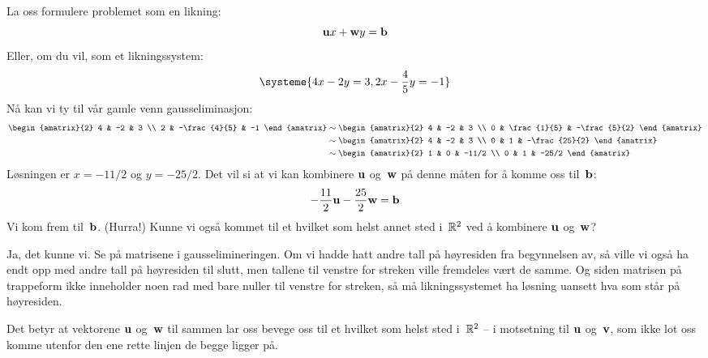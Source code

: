La oss formulere problemet som en likning:
\[
\mathbf{u} x + \mathbf{w} y = \mathbf{b}
\]
Eller, om du vil, som et likningssystem:
\[
\systeme{
  4x - 2y = 3,
  2x - \frac{4}{5}y = -1
  }
\]
Nå kan vi ty til vår gamle venn gausseliminasjon:
\begin{align*}
\begin{amatrix}{2}
4 & -2 & 3 \\
2 & -\frac{4}{5} & -1
\end{amatrix}
&\roweq
\begin{amatrix}{2}
4 & -2 & 3 \\
0 & \frac{1}{5} & -\frac{5}{2}
\end{amatrix}
\\
&\roweq
\begin{amatrix}{2}
4 & -2 & 3 \\
0 & 1 & -\frac{25}{2}
\end{amatrix}
\\
&
\roweq
\begin{amatrix}{2}
1 & 0 & -11/2 \\
0 & 1 & -25/2
\end{amatrix}
\end{align*}
Løsningen er $x = -11/2$ og $y = -25/2$.  Det vil si at vi kan
kombinere $\mathbf{u}$ og~$\mathbf{w}$ på denne måten for å komme oss til~$\mathbf{b}$:
\[
-\frac{11}{2} \mathbf{u} - \frac{25}{2} \mathbf{w} = \mathbf{b}
\]
Vi kom frem til~$\mathbf{b}$.  (Hurra!)  Kunne vi også kommet til et hvilket
som helst annet sted i~$\mathbb{R}^2$ ved å kombinere $\mathbf{u}$ og~$\mathbf{w}$?

Ja, det kunne vi.  Se på matrisene i gausselimineringen.  Om vi hadde
hatt andre tall på høyresiden fra begynnelsen av, så ville vi også ha
endt opp med andre tall på høyresiden til slutt, men tallene til
venstre for streken ville fremdeles vært de samme.  Og siden matrisen
på trappeform ikke inneholder noen rad med bare nuller til venstre for
streken, så må likningssystemet ha løsning uansett hva som står på
høyresiden.

Det betyr at vektorene $\mathbf{u}$ og~$\mathbf{w}$ til sammen lar oss bevege oss til
et hvilket som helst sted i~$\mathbb{R}^2$ -- i motsetning til $\mathbf{u}$ og~$\mathbf{v}$,
som ikke lot oss komme utenfor den ene rette linjen de begge ligger
på.





